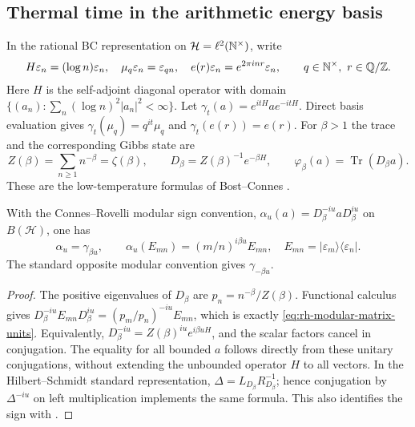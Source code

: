 \subsection{Thermal time in the arithmetic energy basis}

In the rational BC representation on $\mathcal H=\ell^2(\mathbb{N}^\times)$, write
\begin{equation}
 H\varepsilon_n=(\log n)\varepsilon_n,\quad
 \mu_q\varepsilon_n=\varepsilon_{qn},\quad
 e(r)\varepsilon_n=e^{2\pi i nr}\varepsilon_n,
 \qquad q\in\mathbb{N}^\times,\ r\in\mathbb{Q}/\mathbb{Z}.
 \label{eq:rh-bc-representation}
\end{equation}
Here $H$ is the self-adjoint diagonal operator with domain
$\{(a_n):\sum_n(\log n)^2|a_n|^2<\infty\}$.
Let $\gamma_t(a)=e^{itH}ae^{-itH}$. Direct basis evaluation gives
$\gamma_t(\mu_q)=q^{it}\mu_q$ and $\gamma_t(e(r))=e(r)$.
For $\beta>1$ the trace and the corresponding Gibbs state are
\begin{equation}
 Z(\beta)=\sum_{n\ge1}n^{-\beta}=\zeta(\beta),\qquad
 D_\beta=Z(\beta)^{-1}e^{-\beta H},\qquad
 \varphi_\beta(a)=\operatorname{Tr}(D_\beta a).
 \label{eq:rh-gibbs-state}
\end{equation}
These are the low-temperature formulas of Bost--Connes
\cite[\S\S5--7]{bostConnes1995}.

\begin{proposition}
With the Connes--Rovelli modular sign convention,
$\alpha_u(a)=D_\beta^{-iu}aD_\beta^{iu}$ on $B(\mathcal H)$, one has
\begin{equation}
 \alpha_u=\gamma_{\beta u},\qquad
 \alpha_u(E_{mn})=(m/n)^{i\beta u}E_{mn},
 \quad E_{mn}=|\varepsilon_m\rangle\langle\varepsilon_n|.
 \label{eq:rh-modular-matrix-units}
\end{equation}
The standard opposite modular convention gives $\gamma_{-\beta u}$.
\end{proposition}
\begin{proof}
The positive eigenvalues of $D_\beta$ are $p_n=n^{-\beta}/Z(\beta)$.
Functional calculus gives
$D_\beta^{-iu}E_{mn}D_\beta^{iu}=(p_m/p_n)^{-iu}E_{mn}$,
which is exactly \eqref{eq:rh-modular-matrix-units}.
Equivalently,
$D_\beta^{-iu}=Z(\beta)^{iu}e^{i\beta uH}$, and the scalar factors cancel
in conjugation. The equality for all bounded $a$ follows directly from these
unitary conjugations, without extending the unbounded operator $H$ to all
vectors. In the Hilbert--Schmidt standard representation,
$\Delta=L_{D_\beta}R_{D_\beta}^{-1}$; hence conjugation by $\Delta^{-iu}$
on left multiplication implements the same formula.
This also identifies the sign with
\cite[\S2.1, footnote 3; \S4.1, (29), (36)--(42)]{connesRovelli1994}.
\end{proof}

